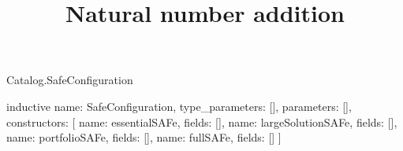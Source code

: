 \begin{lexlean}{Catalog.SafeConfiguration}
\title{Natural number addition}
\begin{semanticmodule}
inductive{
  name: SafeConfiguration,
  type_parameters: [],
  parameters: [],
  constructors: [
    {name: essentialSAFe, fields: []},
    {name: largeSolutionSAFe, fields: []},
    {name: portfolioSAFe, fields: []},
    {name: fullSAFe, fields: []}
  ]
}
\end{semanticmodule}
\end{lexlean}

